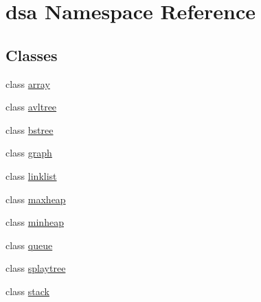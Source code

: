 \hypertarget{namespacedsa}{}\section{dsa Namespace Reference}
\label{namespacedsa}
\subsection*{Classes}
\begin{DoxyCompactItemize}
\item 
class \hyperlink{classdsa_1_1array}{array}
\item 
class \hyperlink{classdsa_1_1avltree}{avltree}
\item 
class \hyperlink{classdsa_1_1bstree}{bstree}
\item 
class \hyperlink{classdsa_1_1graph}{graph}
\item 
class \hyperlink{classdsa_1_1linklist}{linklist}
\item 
class \hyperlink{classdsa_1_1maxheap}{maxheap}
\item 
class \hyperlink{classdsa_1_1minheap}{minheap}
\item 
class \hyperlink{classdsa_1_1queue}{queue}
\item 
class \hyperlink{classdsa_1_1splaytree}{splaytree}
\item 
class \hyperlink{classdsa_1_1stack}{stack}
\end{DoxyCompactItemize}
